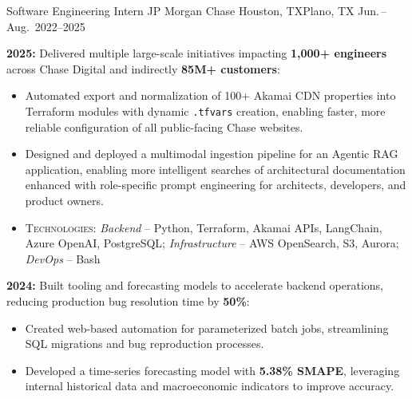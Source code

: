 

\begin{cventries}
\cventry
    {Software Engineering Intern} %
    {JP Morgan Chase} %
    {Houston, TX\newline Plano, TX} %
    {Jun.\,--\,Aug.\ 2022--2025} %
    {
         \begin{cvitems}
          \item {\textbf{2025:} Delivered multiple large-scale initiatives impacting \textbf{1,000+ engineers} across Chase Digital and indirectly \textbf{85M+ customers}:
          \begin{itemize}
            \item Automated export and normalization of 100+ Akamai CDN properties into Terraform modules with dynamic \texttt{.tfvars} creation, enabling faster, more reliable configuration of all public-facing Chase websites.
            \item Designed and deployed a multimodal ingestion pipeline for an Agentic RAG application, enabling more intelligent searches of architectural documentation enhanced with role-specific prompt engineering for architects, developers, and product owners.
          \item \textsc{Technologies}: \textit{Backend} – Python, Terraform, Akamai APIs, LangChain, Azure OpenAI, PostgreSQL; \textit{Infrastructure} – AWS OpenSearch, S3, Aurora; \textit{DevOps} – Bash
          \end{itemize}
          }
          \item { \textbf{2024:} Built tooling and forecasting models to accelerate backend operations, reducing production bug resolution time by \textbf{50\%}:
          \begin{itemize}
            \item Created web-based automation for parameterized batch jobs, streamlining SQL migrations and bug reproduction processes.
            \item Developed a time-series forecasting model with \textbf{5.38\% SMAPE}, leveraging internal historical data and macroeconomic indicators to improve accuracy.

\end{itemize}}
\end{cvitems}}
\end{cventries}
